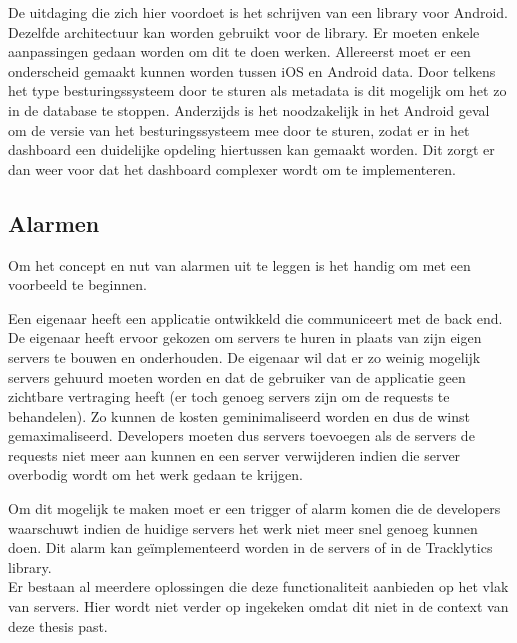 De uitdaging die zich hier voordoet is het schrijven van een library voor Android. Dezelfde architectuur kan worden gebruikt voor de library. Er moeten enkele aanpassingen gedaan worden om dit te doen werken. Allereerst moet er een onderscheid gemaakt kunnen worden tussen iOS en Android data. Door telkens het type besturingssysteem door te sturen als metadata is dit mogelijk om het zo in de database te stoppen. Anderzijds is het noodzakelijk in het Android geval om de versie van het besturingssysteem mee door te sturen, zodat er in het dashboard een duidelijke opdeling hiertussen kan gemaakt worden. Dit zorgt er dan weer voor dat het dashboard complexer wordt om te implementeren.





\subsection{Alarmen}
Om het concept en nut van alarmen uit te leggen is het handig om met een voorbeeld te beginnen. 

Een eigenaar heeft een applicatie ontwikkeld die communiceert met de back end. De eigenaar heeft ervoor gekozen om servers te huren in plaats van zijn eigen servers te bouwen en onderhouden. De eigenaar wil dat er zo weinig mogelijk servers gehuurd moeten worden en dat de gebruiker van de applicatie geen zichtbare vertraging heeft (er toch genoeg servers zijn om de requests te behandelen). Zo kunnen de kosten geminimaliseerd worden en dus de winst gemaximaliseerd. Developers moeten dus servers toevoegen als de servers de requests niet meer aan kunnen en een server verwijderen indien die server overbodig wordt om het werk gedaan te krijgen. 

Om dit mogelijk te maken moet er een trigger of alarm komen die de developers waarschuwt indien de huidige servers het werk niet meer snel genoeg kunnen doen. Dit alarm kan ge\"implementeerd worden in de servers of in de Tracklytics library. \\

Er bestaan al meerdere oplossingen die deze functionaliteit aanbieden op het vlak van servers. Hier wordt niet verder op ingekeken omdat dit niet in de context van deze thesis past. \\

